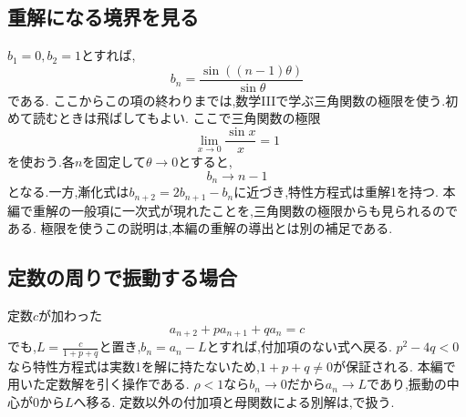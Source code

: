 \subsection{重解になる境界を見る}
$b_1=0,b_2=1$とすれば,
\[
  b_n=\frac{\sin((n-1)\theta)}{\sin\theta}
\]
である.
ここからこの項の終わりまでは,数学IIIで学ぶ三角関数の極限を使う.初めて読むときは飛ばしてもよい.
ここで三角関数の極限
\[
  \lim_{x\to0}\frac{\sin x}{x}=1
\]
を使おう.各$n$を固定して$\theta\to0$とすると,
\[
  b_n\longrightarrow n-1
\]
となる.一方,漸化式は$b_{n+2}=2b_{n+1}-b_n$に近づき,特性方程式は重解1を持つ.
本編で重解の一般項に一次式が現れたことを,三角関数の極限からも見られるのである.
極限を使うこの説明は,本編の重解の導出とは別の補足である.

\subsection{定数の周りで振動する場合}
定数$c$が加わった
\[
  a_{n+2}+pa_{n+1}+qa_n=c
\]
でも,$L=\frac{c}{1+p+q}$と置き,$b_n=a_n-L$とすれば,付加項のない式へ戻る.
$p^2-4q<0$なら特性方程式は実数1を解に持たないため,$1+p+q\ne0$が保証される.
本編で用いた定数解を引く操作である.
$\rho<1$なら$b_n\to0$だから$a_n\to L$であり,振動の中心が0から$L$へ移る.
定数以外の付加項と母関数による別解は,で扱う.

